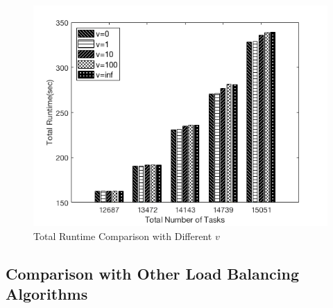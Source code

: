 \begin{figure}[h!]
\centering
\includegraphics[width=1\linewidth]{images/res_opt_vs_opt_timep}
\caption{Total Runtime Comparison with Different $v$ }
\label{res_opt_vs_opt_time}
\end{figure}


\subsection{Comparison with Other Load Balancing Algorithms}



